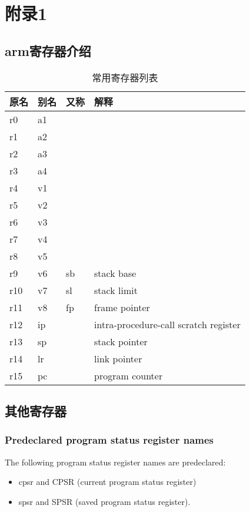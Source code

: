 \chapter{附录1}

\section{arm寄存器介绍}
\newpage
\begin{table}[htbp]
\caption{常用寄存器列表}
\centering
\begin{tabular}{p{20pt}p{20pt}p{20pt}p{100pt}}
    \toprule
    原名& 别名 & 又称 & 解释\\
    \midrule
    r0  &  a1 &      & \\
    r1  &  a2 &      & \\
    r2  &  a3 &      & \\
    r3  &  a4 &      & \\
    r4  &  v1 &      & \\
    r5  &  v2 &      & \\
    r6  &  v3 &      & \\
    r7  &  v4 &      & \\
    r8  &  v5 &      & \\
    r9  &  v6 &   sb & stack base\\
    r10 &  v7 &   sl & stack limit\\
    r11 &  v8 &   fp & frame pointer\\
    r12 &  ip &      & intra-procedure-call scratch register\\
    r13 &  sp &      & stack pointer\\
    r14 &  lr &      & link pointer\\
    r15 &  pc &      & program counter\\
    \bottomrule
\end{tabular}
\end{table}

\section{其他寄存器}

\subsection{Predeclared program status register names}
The following program status register names are predeclared:
\begin{itemize}
    \item cpsr and CPSR (current program status register)
    \item spsr and SPSR (saved program status register).
\end{itemize}

